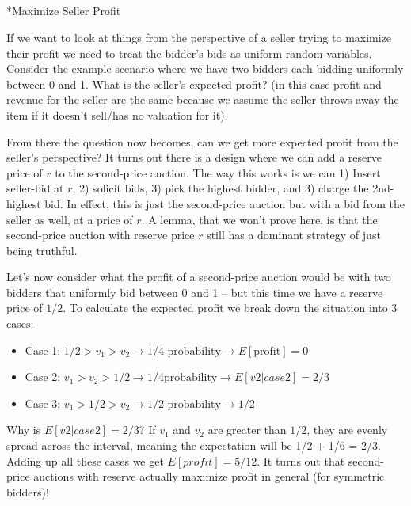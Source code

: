 \documentclass[
  letterpaper,
  numbers=noenddot,
  DIV=11]{scrreprt}
\makeatletter
\let\oldsubparagraph\subparagraph
\renewcommand{\subparagraph}{
    \@ifstar
      \xxxSubParagraphStar
      \xxxSubParagraphNoStar
  }
\newcommand{\xxxSubParagraphStar}[1]{\oldsubparagraph*{#1}\mbox{}}
\newcommand{\xxxSubParagraphNoStar}[1]{\oldsubparagraph{#1}\mbox{}}
\theoremstyle{plain}
\theoremstyle{definition}
\theoremstyle{plain}
\theoremstyle{remark}
\makeatother
\begin{document}
\subparagraph*{Maximize Seller Profit}\label{maximize-seller-profit}

If we want to look at things from the perspective of a seller trying to
maximize their profit we need to treat the bidder's bids as uniform
random variables. Consider the example scenario where we have two
bidders each bidding uniformly between 0 and 1. What is the seller's
expected profit? (in this case profit and revenue for the seller are the
same because we assume the seller throws away the item if it doesn't
sell/has no valuation for it).

From there the question now becomes, can we get more expected profit
from the seller's perspective? It turns out there is a design where we
can add a reserve price of \(r\) to the second-price auction. The way
this works is we can 1) Insert seller-bid at \(r\), 2) solicit bids, 3)
pick the highest bidder, and 3) charge the 2nd-highest bid. In effect,
this is just the second-price auction but with a bid from the seller as
well, at a price of \(r\). A lemma, that we won't prove here, is that
the second-price auction with reserve price \(r\) still has a dominant
strategy of just being truthful.

Let's now consider what the profit of a second-price auction would be
with two bidders that uniformly bid between 0 and 1 -- but this time we
have a reserve price of \(1/2\). To calculate the expected profit we
break down the situation into 3 cases:

\begin{itemize}
\item
  Case 1:
  \(1/2 > v_1 > v_2 \rightarrow 1/4 \text{ probability} \rightarrow  E[\text{profit}] = 0\)
\item
  Case 2:
  \(v_1 > v_2 > 1/2 \rightarrow 1/4 \text{probability} \rightarrow E[v2 | case 2] = 2/3\)
\item
  Case 3:
  \(v_1 > 1/2 > v_2 \rightarrow 1/2 \text{ probability} \rightarrow 1/2\)
\end{itemize}

Why is \(E[v2 | case 2] = 2/3\)? If \(v_1\) and \(v_2\) are greater than
\(1/2\), they are evenly spread across the interval, meaning the
expectation will be 1/2 + 1/6 = 2/3. Adding up all these cases we get
\(E[profit] = 5/12\). It turns out that second-price auctions with
reserve actually maximize profit in general (for symmetric bidders)!
\end{document}
